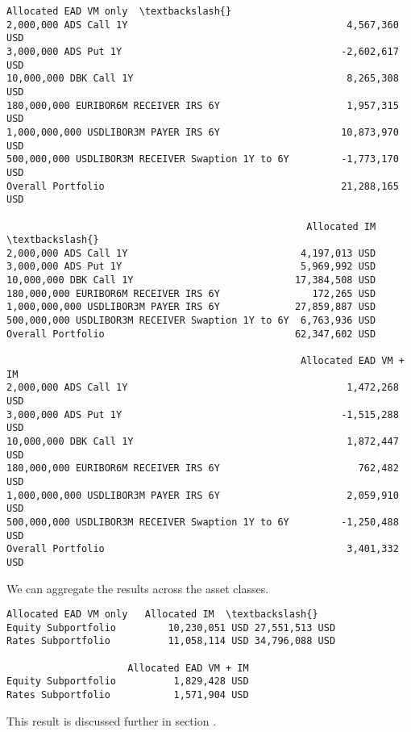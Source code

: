             \begin{tcolorbox}[breakable, size=fbox, boxrule=.5pt, pad at break*=1mm, opacityfill=0]
\begin{Verbatim}[commandchars=\\\{\}]
                                                   Allocated EAD VM only  \textbackslash{}
2,000,000 ADS Call 1Y                                      4,567,360 USD
3,000,000 ADS Put 1Y                                      -2,602,617 USD
10,000,000 DBK Call 1Y                                     8,265,308 USD
180,000,000 EURIBOR6M RECEIVER IRS 6Y                      1,957,315 USD
1,000,000,000 USDLIBOR3M PAYER IRS 6Y                     10,873,970 USD
500,000,000 USDLIBOR3M RECEIVER Swaption 1Y to 6Y         -1,773,170 USD
Overall Portfolio                                         21,288,165 USD

                                                    Allocated IM  \textbackslash{}
2,000,000 ADS Call 1Y                              4,197,013 USD
3,000,000 ADS Put 1Y                               5,969,992 USD
10,000,000 DBK Call 1Y                            17,384,508 USD
180,000,000 EURIBOR6M RECEIVER IRS 6Y                172,265 USD
1,000,000,000 USDLIBOR3M PAYER IRS 6Y             27,859,887 USD
500,000,000 USDLIBOR3M RECEIVER Swaption 1Y to 6Y  6,763,936 USD
Overall Portfolio                                 62,347,602 USD

                                                   Allocated EAD VM + IM
2,000,000 ADS Call 1Y                                      1,472,268 USD
3,000,000 ADS Put 1Y                                      -1,515,288 USD
10,000,000 DBK Call 1Y                                     1,872,447 USD
180,000,000 EURIBOR6M RECEIVER IRS 6Y                        762,482 USD
1,000,000,000 USDLIBOR3M PAYER IRS 6Y                      2,059,910 USD
500,000,000 USDLIBOR3M RECEIVER Swaption 1Y to 6Y         -1,250,488 USD
Overall Portfolio                                          3,401,332 USD
\end{Verbatim}
\end{tcolorbox}
        
    We can aggregate the results across the asset classes.

            \begin{tcolorbox}[breakable, size=fbox, boxrule=.5pt, pad at break*=1mm, opacityfill=0]
\begin{Verbatim}[commandchars=\\\{\}]
                     Allocated EAD VM only   Allocated IM  \textbackslash{}
Equity Subportfolio         10,230,051 USD 27,551,513 USD
Rates Subportfolio          11,058,114 USD 34,796,088 USD

                     Allocated EAD VM + IM
Equity Subportfolio          1,829,428 USD
Rates Subportfolio           1,571,904 USD
\end{Verbatim}
\end{tcolorbox}
        
    This result is discussed further in section .


